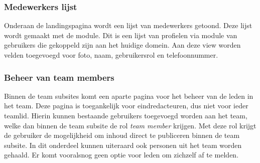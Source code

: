 \subsubsection{Medewerkers lijst}

Onderaan de landingspagina wordt een lijst van medewerkers getoond. Deze lijst wordt gemaakt met de  module. Dit is een lijst van profielen via  module van gebruikers die gekoppeld zijn aan het huidige domein. Aan deze view worden velden toegevoegd voor foto, naam, gebruikersrol en telefoonnummer.

\subsubsection{Beheer van team members}\label{teammemberbeheer}

Binnen de team subsites komt een aparte pagina voor het beheer van de leden in het team. Deze pagina is toegankelijk voor eindredacteuren, dus niet voor ieder teamlid. Hierin kunnen bestaande gebruikers toegevoegd worden aan het team, welke dan binnen de team subsite de rol \emph{team member} krijgen. Met deze rol krijgt de gebruiker de mogelijkheid om inhoud direct te publiceren binnen de team subsite. In dit onderdeel kunnen uiteraard ook personen uit het team worden gehaald. Er komt vooralsnog geen optie voor leden om zichzelf af te melden.

